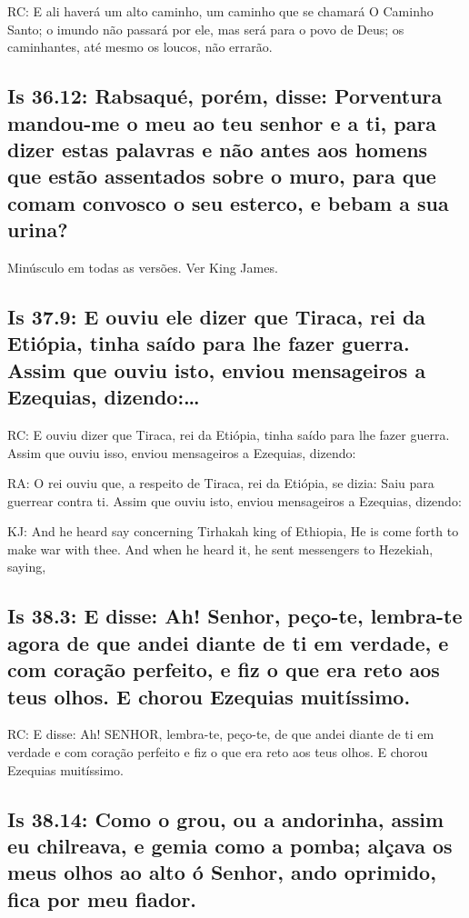 RC: E ali haverá um alto caminho, um caminho que se chamará O Caminho Santo; o imundo não passará por ele, mas será para o povo de Deus; os caminhantes, até mesmo os loucos, não errarão.

\subsection{Is 36.12: Rabsaqué, porém, disse: Porventura mandou-me o meu  ao teu senhor e a ti, para dizer estas palavras e não antes aos homens que estão assentados sobre o muro, para que comam convosco o seu esterco, e bebam a sua urina?}
Minúsculo em todas as versões.
Ver King James.

\subsection{Is 37.9: E\uwave{,} ouviu ele dizer que Tiraca, rei da Etiópia, tinha saído para lhe fazer guerra. Assim que ouviu isto, enviou mensageiros a Ezequias, dizendo:\ldots}

RC: E ouviu dizer que Tiraca, rei da Etiópia, tinha saído para lhe fazer guerra. Assim que ouviu isso, enviou mensageiros a Ezequias, dizendo:

RA: O rei ouviu que, a respeito de Tiraca, rei da Etiópia, se dizia: Saiu para guerrear contra ti. Assim que ouviu isto, enviou mensageiros a Ezequias, dizendo:

KJ: And he heard say concerning Tirhakah king of Ethiopia, He is come forth to make war with thee. And when he heard it, he sent messengers to Hezekiah, saying,

\subsection{Is 38.3: E disse: Ah! Senhor, peço-te, lembra-te agora\uwave{,} de que andei diante de ti em verdade, e com coração perfeito, e fiz o que era reto aos teus olhos. E chorou Ezequias muitíssimo.}

RC:  E disse: Ah! SENHOR, lembra-te, peço-te, de que andei diante de ti em verdade e com coração perfeito e fiz o que era reto aos teus olhos. E chorou Ezequias muitíssimo.

\subsection{Is 38.14: Como o grou, ou a andorinha, assim eu chilreava, e gemia como a pomba; alçava os meus olhos ao alto\uwave{;} ó Senhor, ando oprimido, fica por meu fiador.}

